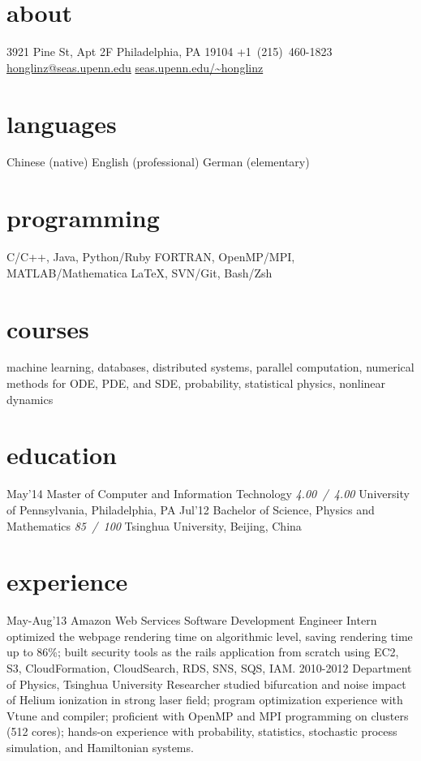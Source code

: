 \documentclass[]{friggeri-cv}
\begin{document}
{}

\begin{aside}
  \section{about}
  3921 Pine St, Apt 2F
  Philadelphia, PA
  19104
  +1~(215)~460-1823
  \href{mailto:honglinz@seas.upenn.edu}{honglinz@seas.upenn.edu}
  \href{http://www.seas.upenn.edu/~honglinz}{seas.upenn.edu/\textasciitilde{}honglinz}
  \section{languages}
  Chinese (native)
  English (professional)
  German (elementary)
  \section{programming}
  C/C++, Java, Python/Ruby
  FORTRAN, OpenMP/MPI, MATLAB/Mathematica
  \LaTeX, SVN/Git, Bash/Zsh
\end{aside}

\section{courses}
machine learning, databases, distributed systems, parallel computation, numerical methods for ODE, PDE, and SDE, probability, statistical physics, nonlinear dynamics
\section{education}

\begin{entrylist}
  \entry
    {May'14}
    {Master of Computer and Information Technology}
    {\emph{4.00~/~4.00}}
    {University of Pennsylvania, Philadelphia, PA}
  \entry
    {Jul'12}
    {Bachelor of Science, Physics and Mathematics}
    {\emph{85~/~100}}
    {Tsinghua University, Beijing, China}
\end{entrylist}
\section{experience}
\begin{entrylist}
  \entry
  {May-Aug'13}
  {Amazon Web Services}
  {Software Development Engineer Intern}
  {optimized the webpage rendering time on algorithmic level, saving rendering time up to 86\%; built security tools as the rails application from scratch using EC2, S3, CloudFormation, CloudSearch, RDS, SNS, SQS, IAM.}
  \entry
  {2010-2012}
  {Department of Physics, Tsinghua University}
  {Researcher}
  {studied bifurcation and noise impact of Helium ionization in strong laser field; program optimization experience with Vtune and compiler; proficient with OpenMP and MPI programming on clusters (512 cores); hands-on experience with probability, statistics, stochastic process simulation, and Hamiltonian systems.}
\end{entrylist}
\end{document}
